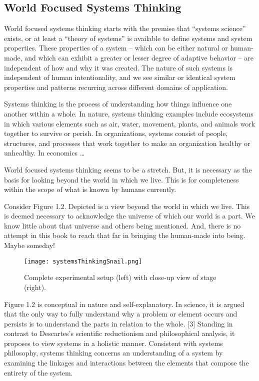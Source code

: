 \subsection{World Focused Systems Thinking}

World focused systems thinking starts with the premise that “systems science” exists, or at least a “theory of systems” is available to define systems and system properties. These properties of a system – which can be either natural or human-made, and which can exhibit a greater or lesser degree of adaptive behavior – are independent of how and why it was created. The nature of such systems is independent of human intentionality, and we see similar or identical system properties and patterns recurring across different domains of application.

Systems thinking is the process of understanding how things influence one another within a whole. In nature, systems thinking examples include ecosystems in which various elements such as air, water, movement, plants, and animals work together to survive or perish. In organizations, systems consist of people, structures, and processes that work together to make an organization healthy or unhealthy. In economics …

World focused systems thinking seems to be a stretch. But, it is necessary as the basis for looking beyond the world in which we live. This is for completeness within the scope of what is known by humans currently.

Consider Figure 1.2. Depicted is a view beyond the world in which we live. This is deemed necessary to acknowledge the universe of which our world is a part. We know little about that universe and others being mentioned. And, there is no attempt in this book to reach that far in bringing the human-made into being. Maybe someday!

\begin{figure}[h]
\centering
\texttt{[image: systemsThinkingSnail.png]}
\caption{Complete experimental setup (left) with close-up view of stage (right).}
\label{fig:systemsThinkingSnail}
\end{figure}

Figure 1.2 is conceptual in nature and self-explanatory. In science, it is argued that the only way to fully understand why a problem or element occurs and persists is to understand the parts in relation to the whole. [3] Standing in contrast to Descartes’s scientific reductionism and philosophical analysis, it proposes to view systems in a holistic manner. Consistent with systems philosophy, systems thinking concerns an understanding of a system by examining the linkages and interactions between the elements that compose the entirety of the system.

